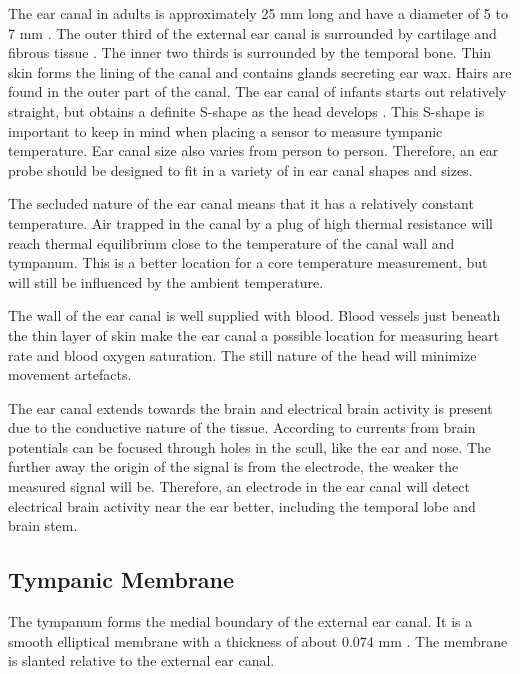 The ear canal in adults is approximately 25 mm long and have a diameter of 5 to 7 mm \citep{alvord1997anatomy}. The outer third of the external ear canal is surrounded by cartilage and fibrous tissue \citep{ExternalAuditoryCanal}. The inner two thirds is surrounded by the temporal bone. Thin skin forms the lining of the canal and contains glands secreting ear wax. Hairs are found in the outer part of the canal. The ear canal of infants starts out relatively straight, but obtains a definite S-shape as the head develops \citep{alvord1997anatomy}. This S-shape is important to keep in mind when placing a sensor to measure tympanic temperature. Ear canal size also varies from person to person. Therefore, an ear probe should be designed to fit in a variety of in ear canal shapes and sizes.

\medskip
The secluded nature of the ear canal means that it has a relatively constant temperature. Air trapped in the canal by a plug of high thermal resistance will reach thermal equilibrium close to the temperature of the canal wall and tympanum. This is a better location for a core temperature measurement, but will still be influenced by the ambient temperature.

\medskip
The wall of the ear canal is well supplied with blood. Blood vessels just beneath the thin layer of skin make the ear canal a possible location for measuring heart rate and blood oxygen saturation. The still nature of the head will minimize movement artefacts.

\medskip
The ear canal extends towards the brain and electrical brain activity is present due to the conductive nature of the tissue. According to \cite{nunez2006electric} currents from brain potentials can be focused through holes in the scull, like the ear and nose. The further away the origin of the signal is from the electrode, the weaker the measured signal will be. Therefore, an electrode in the ear canal will detect electrical brain activity near the ear better, including the temporal lobe and brain stem.

\subsection{Tympanic Membrane}
The tympanum forms the medial boundary of the external ear canal. It is a smooth elliptical membrane with a thickness of about 0.074 mm \citep{alvord1997anatomy}. The membrane is slanted relative to the external ear canal.

